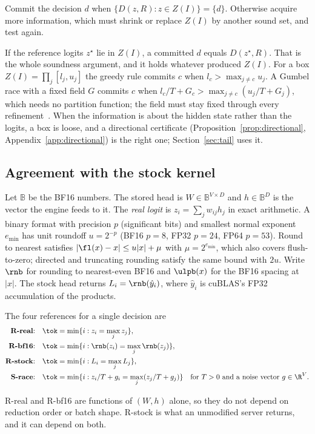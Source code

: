 \begin{definition}\label{def:commit}
Commit the decision $d$ when $\{D(z,R):z\in Z(I)\}=\{d\}$. Otherwise acquire more information, which must shrink or replace $Z(I)$ by another sound set, and test again.
\end{definition}
If the reference logits $z^\star$ lie in $Z(I)$, a committed $d$ equals $D(z^\star,R)$. That is the whole soundness argument, and it holds whatever produced $Z(I)$. For a box $Z(I)=\prod_j[l_j,u_j]$ the greedy rule commits $c$ when $l_c>\max_{j\neq c}u_j$. A Gumbel race with a fixed field $G$ commits $c$ when $l_c/T+G_c>\max_{j\ne c}(u_j/T+G_j)$, which needs no partition function; the field must stay fixed through every refinement~\cite{astar}. When the information is about the hidden state rather than the logits, a box is loose, and a directional certificate (Proposition~\ref{prop:directional}, Appendix~\ref{app:directional}) is the right one; Section~\ref{sec:tail} uses it.

\subsection{Agreement with the stock kernel}\label{sec:headcontracts}
Let $\mathbb B$ be the BF16 numbers. The stored head is $W\in\mathbb B^{V\times D}$ and $h\in\mathbb B^D$ is the vector the engine feeds to it. The \emph{real logit} is $z_i=\sum_jw_{ij}h_j$ in exact arithmetic. A binary format with precision $p$ (significant bits) and smallest normal exponent $e_{\min}$ has unit roundoff $u=2^{-p}$ (BF16 $p=8$, FP32 $p=24$, FP64 $p=53$). Round to nearest satisfies $|\fl(x)-x|\le u|x|+\mu$ with $\mu=2^{e_{\min}}$, which also covers flush-to-zero; directed and truncating rounding satisfy the same bound with $2u$. Write $\rnb$ for rounding to nearest-even BF16 and $\ulpb(x)$ for the BF16 spacing at $|x|$. The stock head returns $L_i=\rnb(\hat y_i)$, where $\hat y_i$ is cuBLAS's FP32 accumulation of the products.

\begin{definition}\label{def:contracts}
The four references for a single decision are
\begin{align*}
\text{\textbf{R-real}:}&\quad\tok=\min\{i:z_i=\max_jz_j\},\\
\text{\textbf{R-bf16}:}&\quad\tok=\min\{i:\rnb(z_i)=\max_j\rnb(z_j)\},\\
\text{\textbf{R-stock}:}&\quad\tok=\min\{i:L_i=\max_jL_j\},\\
\text{\textbf{S-race}:}&\quad\tok=\min\{i:z_i/T+g_i=\max_j(z_j/T+g_j)\}\quad\text{for $T>0$ and a noise vector $g\in\R^V$.}
\end{align*}
\end{definition}
R-real and R-bf16 are functions of $(W,h)$ alone, so they do not depend on reduction order or batch shape. R-stock is what an unmodified server returns, and it can depend on both.

